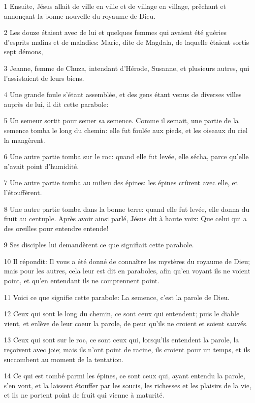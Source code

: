 \par 1 Ensuite, Jésus allait de ville en ville et de village en village, prêchant et annonçant la bonne nouvelle du royaume de Dieu.
\par 2 Les douze étaient avec de lui et quelques femmes qui avaient été guéries d'esprits malins et de maladies: Marie, dite de Magdala, de laquelle étaient sortis sept démons,
\par 3 Jeanne, femme de Chuza, intendant d'Hérode, Susanne, et plusieurs autres, qui l'assistaient de leurs biens.
\par 4 Une grande foule s'étant assemblée, et des gens étant venus de diverses villes auprès de lui, il dit cette parabole:
\par 5 Un semeur sortit pour semer sa semence. Comme il semait, une partie de la semence tomba le long du chemin: elle fut foulée aux pieds, et les oiseaux du ciel la mangèrent.
\par 6 Une autre partie tomba sur le roc: quand elle fut levée, elle sécha, parce qu'elle n'avait point d'humidité.
\par 7 Une autre partie tomba au milieu des épines: les épines crûrent avec elle, et l'étouffèrent.
\par 8 Une autre partie tomba dans la bonne terre: quand elle fut levée, elle donna du fruit au centuple. Après avoir ainsi parlé, Jésus dit à haute voix: Que celui qui a des oreilles pour entendre entende!
\par 9 Ses disciples lui demandèrent ce que signifiait cette parabole.
\par 10 Il répondit: Il vous a été donné de connaître les mystères du royaume de Dieu; mais pour les autres, cela leur est dit en paraboles, afin qu'en voyant ils ne voient point, et qu'en entendant ils ne comprennent point.
\par 11 Voici ce que signifie cette parabole: La semence, c'est la parole de Dieu.
\par 12 Ceux qui sont le long du chemin, ce sont ceux qui entendent; puis le diable vient, et enlève de leur coeur la parole, de peur qu'ils ne croient et soient sauvés.
\par 13 Ceux qui sont sur le roc, ce sont ceux qui, lorsqu'ils entendent la parole, la reçoivent avec joie; mais ils n'ont point de racine, ils croient pour un temps, et ils succombent au moment de la tentation.
\par 14 Ce qui est tombé parmi les épines, ce sont ceux qui, ayant entendu la parole, s'en vont, et la laissent étouffer par les soucis, les richesses et les plaisirs de la vie, et ils ne portent point de fruit qui vienne à maturité.
